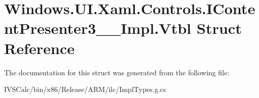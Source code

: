 \hypertarget{struct_windows_1_1_u_i_1_1_xaml_1_1_controls_1_1_i_content_presenter3_____impl_1_1_vtbl}{}\section{Windows.\+U\+I.\+Xaml.\+Controls.\+I\+Content\+Presenter3\+\_\+\+\_\+\+Impl.\+Vtbl Struct Reference}
\label{struct_windows_1_1_u_i_1_1_xaml_1_1_controls_1_1_i_content_presenter3_____impl_1_1_vtbl}


The documentation for this struct was generated from the following file\+:\begin{DoxyCompactItemize}
\item 
I\+V\+S\+Calc/bin/x86/\+Release/\+A\+R\+M/ilc/Impl\+Types.\+g.\+cs\end{DoxyCompactItemize}
